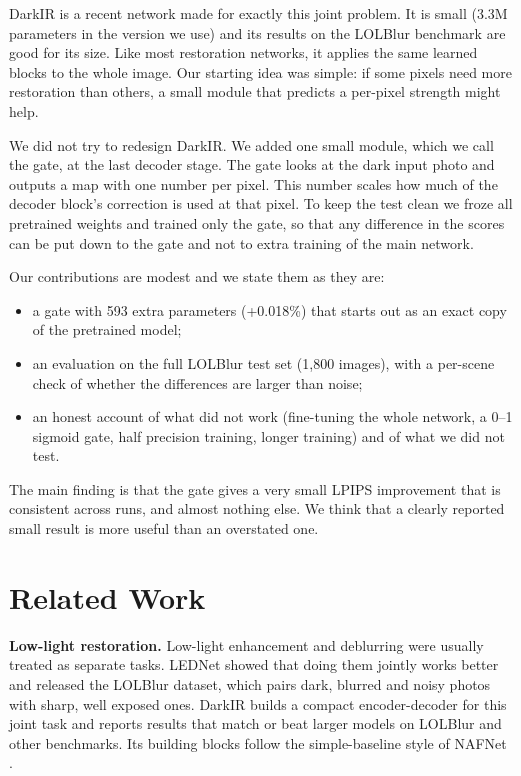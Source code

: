 \documentclass[conference]{IEEEtran}
\begin{document}
DarkIR \cite{darkir} is a recent network made for exactly this joint problem. It is small (3.3M parameters in the version we use) and its results on the LOLBlur benchmark \cite{lednet} are good for its size. Like most restoration networks, it applies the same learned blocks to the whole image. Our starting idea was simple: if some pixels need more restoration than others, a small module that predicts a per-pixel strength might help.

We did not try to redesign DarkIR. We added one small module, which we call the gate, at the last decoder stage. The gate looks at the dark input photo and outputs a map with one number per pixel. This number scales how much of the decoder block's correction is used at that pixel. To keep the test clean we froze all pretrained weights and trained only the gate, so that any difference in the scores can be put down to the gate and not to extra training of the main network.

Our contributions are modest and we state them as they are:
\begin{itemize}
\item a gate with 593 extra parameters (+0.018\%) that starts out as an exact copy of the pretrained model;
\item an evaluation on the full LOLBlur test set (1{,}800 images), with a per-scene check of whether the differences are larger than noise;
\item an honest account of what did not work (fine-tuning the whole network, a 0--1 sigmoid gate, half precision training, longer training) and of what we did not test.
\end{itemize}
The main finding is that the gate gives a very small LPIPS improvement that is consistent across runs, and almost nothing else. We think that a clearly reported small result is more useful than an overstated one.

\section{Related Work}
\textbf{Low-light restoration.} Low-light enhancement and deblurring were usually treated as separate tasks. LEDNet \cite{lednet} showed that doing them jointly works better and released the LOLBlur dataset, which pairs dark, blurred and noisy photos with sharp, well exposed ones. DarkIR \cite{darkir} builds a compact encoder-decoder for this joint task and reports results that match or beat larger models on LOLBlur and other benchmarks. Its building blocks follow the simple-baseline style of NAFNet \cite{nafnet}.
\end{document}
